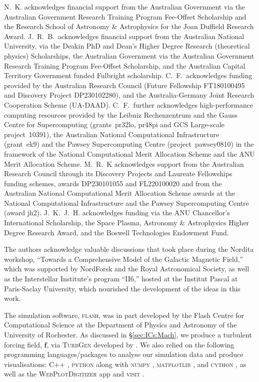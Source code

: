 \documentclass[12pt,twoside]{extreport}
\newcommand{\mVector}[1]{\bm{#1}} %
\begin{document}
N.~K. acknowledges financial support from the Australian Government via the Australian Government Research Training Program Fee-Offset Scholarship and the Research School of Astronomy \& Astrophysics for the Joan Duffield Research Award. J.~R.~B.~acknowledges financial support from the Australian National University, via the Deakin PhD and Dean's Higher Degree Research (theoretical physics) Scholarships, the Australian Government via the Australian Government Research Training Program Fee-Offset Scholarship, and the Australian Capital Territory Government funded Fulbright scholarship. C.~F.~acknowledges funding provided by the Australian Research Council (Future Fellowship FT180100495 and Discovery Project DP230102280), and the Australia-Germany Joint Research Cooperation Scheme (UA-DAAD). C.~F.~further acknowledges high-performance computing resources provided by the Leibniz Rechenzentrum and the Gauss Centre for Supercomputing (grants~pr32lo, pr48pi and GCS Large-scale project~10391), the Australian National Computational Infrastructure (grant~ek9) and the Pawsey Supercomputing Centre (project~pawsey0810) in the framework of the National Computational Merit Allocation Scheme and the ANU Merit Allocation Scheme. M.~R.~K acknowledges support from the Australian Research Council through its Discovery Projects and Laureate Fellowships funding schemes, awards DP230101055 and FL220100020 and from the Australian National Computational Merit Allocation Scheme awards at the National Computational Infrastructure and the Pawsey Supercomputing Centre (award jh2). J.~K.~J.~H. acknowledges funding via the ANU Chancellor’s International Scholarship, the Space Plasma, Astronomy \& Astrophysics Higher Degree Research Award, and the Boswell Technologies Endowment Fund.

The authors acknowledge valuable discussions that took place during the Nordita workshop, ``Towards a Comprehensive Model of the Galactic Magnetic Field,'' which was supported by NordForsk and the Royal Astronomical Society, as well as the Interstellar Institute's program ``II6,'' hosted at the Institut Pascal at Paris-Saclay University, which nourished the development of the ideas in this work.

The simulation software, \textsc{flash}, was in part developed by the Flash Centre for Computational Science at the Department of Physics and Astronomy of the University of Rochester. As discussed in \S\ref{sec:ICs:Mach}, we produce a turbulent forcing field, $\mVector{f}$, via \textsc{TurbGen} developed by \citet{federrath2010comparing}. We also relied on the following programming languages/packages to analyse our simulation data and produce visualisations: \textsc{C++} \citep{stroustrup2013cpp}, \textsc{python} along with \textsc{numpy} \citep{oliphant2006guide, van2011numpy, harris2020array}, \textsc{matplotlib} \citep{hunter2007matplotlib, bisong2019matplotlib}, and \textsc{cython} \citep{behnel2010cython, smith2015cython}, as well as the \textsc{WebPlotDigitizer} app \citep{Rohatgi2022} and \textsc{visit} \citep{childs2012visit}.
\end{document}
